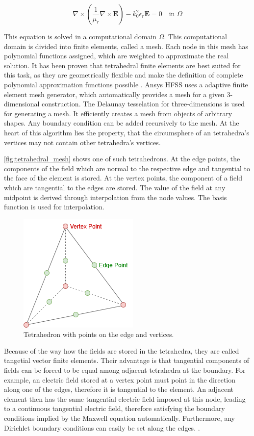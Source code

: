 \begin{equation}
    \nabla\times\left(\frac{1}{\mu_r}\nabla\times\mathbf{E}\right)-k_0^2\epsilon_r\mathbf{E}=0 \quad\text{in $\Omega$}
    \label{eqn:full_wave_equation}
\end{equation}

This equation is solved in a computational domain $\Omega$. This computational domain is divided into finite elements, called a mesh. Each node in this mesh has polynomial functions assigned, which are weighted to approximate the real solution. It has been proven that tetrahedral finite elements are best suited for this task, as they are geometrically flexible and make the definition of complete polynomial approximation functions possible \cite{Shenton_Cendes_1985}. Ansys HFSS uses a adaptive finite element mesh generator, which automatically provides a mesh for a given 3-dimensional construction. The Delaunay tesselation for three-dimensions is used for generating a mesh. It efficiently creates a mesh from objects of arbitrary shapes. Any boundary condition can be added recursively to the mesh. At the heart of this algorithm lies the property, that the circumsphere of an tetrahedra's vertices may not contain other tetrahedra's vertices. 

\autoref{fig:tetrahedral_mesh} shows one of such tetrahedrons. At the edge points, the components of the field which are normal to the respective edge and tangential to the face of the element is stored. At the vertex points, the component of a field which are tangential to the edges are stored. The value of the field at any midpoint is derived through interpolation from the node values. The basis function is used for interpolation.

\begin{figure}[h]
    \centering
    \includegraphics[width=0.25\linewidth]{Documentation/content/10_theory/img/tetrahedral_mesh.png}
    \caption{Tetrahedron with points on the edge and vertices.}
    \label{fig:tetrahedral_mesh}
\end{figure}

Because of the way how the fields are stored in the tetrahedra, they are called tangetial vector finite elements. Their advantage is that tangential components of fields can be forced to be equal among adjacent tetrahedra at the boundary. For example, an electric field stored at a vertex point must point in the direction along one of the edges, therefore it is tangential to the element. An adjacent element then has the same tangential electric field imposed at this node, leading to a continuous tangential electric field, therefore satisfying the boundary conditions implied by the Maxwell equation automatically. Furthermore, any Dirichlet boundary conditions can easily be set along the edges.
\cite{85399}. 

